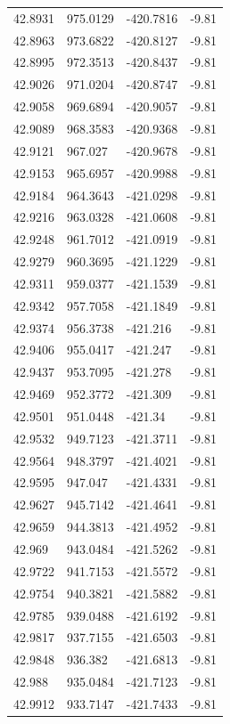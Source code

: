 \begin{table}[H]
\begin{tabular}{llll}
42.8931 & 975.0129 & -420.7816 & -9.81 \\
42.8963 & 973.6822 & -420.8127 & -9.81 \\
42.8995 & 972.3513 & -420.8437 & -9.81 \\
42.9026 & 971.0204 & -420.8747 & -9.81 \\
42.9058 & 969.6894 & -420.9057 & -9.81 \\
42.9089 & 968.3583 & -420.9368 & -9.81 \\
42.9121 & 967.027 & -420.9678 & -9.81 \\
42.9153 & 965.6957 & -420.9988 & -9.81 \\
42.9184 & 964.3643 & -421.0298 & -9.81 \\
42.9216 & 963.0328 & -421.0608 & -9.81 \\
42.9248 & 961.7012 & -421.0919 & -9.81 \\
42.9279 & 960.3695 & -421.1229 & -9.81 \\
42.9311 & 959.0377 & -421.1539 & -9.81 \\
42.9342 & 957.7058 & -421.1849 & -9.81 \\
42.9374 & 956.3738 & -421.216 & -9.81 \\
42.9406 & 955.0417 & -421.247 & -9.81 \\
42.9437 & 953.7095 & -421.278 & -9.81 \\
42.9469 & 952.3772 & -421.309 & -9.81 \\
42.9501 & 951.0448 & -421.34 & -9.81 \\
42.9532 & 949.7123 & -421.3711 & -9.81 \\
42.9564 & 948.3797 & -421.4021 & -9.81 \\
42.9595 & 947.047 & -421.4331 & -9.81 \\
42.9627 & 945.7142 & -421.4641 & -9.81 \\
42.9659 & 944.3813 & -421.4952 & -9.81 \\
42.969 & 943.0484 & -421.5262 & -9.81 \\
42.9722 & 941.7153 & -421.5572 & -9.81 \\
42.9754 & 940.3821 & -421.5882 & -9.81 \\
42.9785 & 939.0488 & -421.6192 & -9.81 \\
42.9817 & 937.7155 & -421.6503 & -9.81 \\
42.9848 & 936.382 & -421.6813 & -9.81 \\
42.988 & 935.0484 & -421.7123 & -9.81 \\
42.9912 & 933.7147 & -421.7433 & -9.81 \\

\end{tabular}
\end{table}
